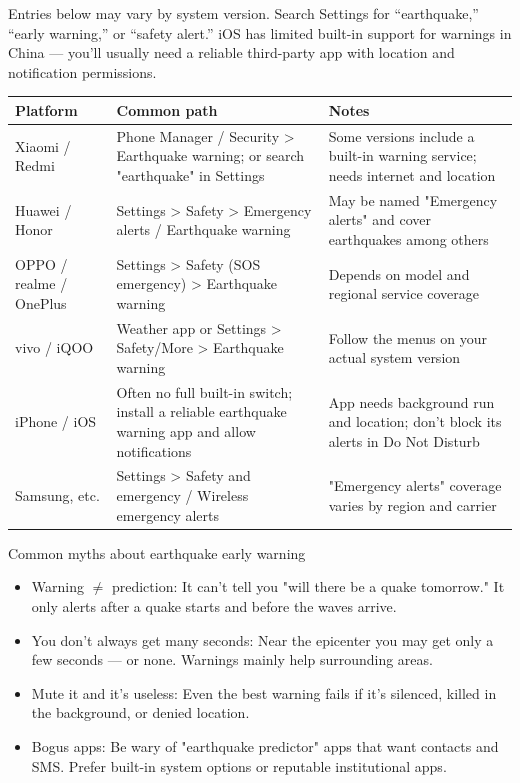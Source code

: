 
Entries below may vary by system version. Search Settings for “earthquake,” “early warning,” or “safety alert.” iOS has limited built-in support for warnings in China — you'll usually need a reliable third-party app with location and notification permissions.

\begin{center}
\begin{tabularx}{\linewidth}{|X|X|X|}
\hline
\textbf{Platform} & \textbf{Common path} & \textbf{Notes} \tabularnewline
\hline
Xiaomi / Redmi & Phone Manager / Security > Earthquake warning; or search "earthquake" in Settings & Some versions include a built-in warning service; needs internet and location \tabularnewline
Huawei / Honor & Settings > Safety > Emergency alerts / Earthquake warning & May be named "Emergency alerts" and cover earthquakes among others \tabularnewline
OPPO / realme / OnePlus & Settings > Safety (SOS emergency) > Earthquake warning & Depends on model and regional service coverage \tabularnewline
vivo / iQOO & Weather app or Settings > Safety/More > Earthquake warning & Follow the menus on your actual system version \tabularnewline
iPhone / iOS & Often no full built-in switch; install a reliable earthquake warning app and allow notifications & App needs background run and location; don't block its alerts in Do Not Disturb \tabularnewline
Samsung, etc. & Settings > Safety and emergency / Wireless emergency alerts & "Emergency alerts" coverage varies by region and carrier \tabularnewline
\hline
\end{tabularx}
\end{center}

\begin{tcbwarn}{Common myths about earthquake early warning}
\begin{itemize}
  \item Warning $\neq$ prediction: It can't tell you "will there be a quake tomorrow." It only alerts after a quake starts and before the waves arrive.
  \item You don't always get many seconds: Near the epicenter you may get only a few seconds — or none. Warnings mainly help surrounding areas.
  \item Mute it and it's useless: Even the best warning fails if it's silenced, killed in the background, or denied location.
  \item Bogus apps: Be wary of "earthquake predictor" apps that want contacts and SMS. Prefer built-in system options or reputable institutional apps.
\end{itemize}

\end{tcbwarn}

